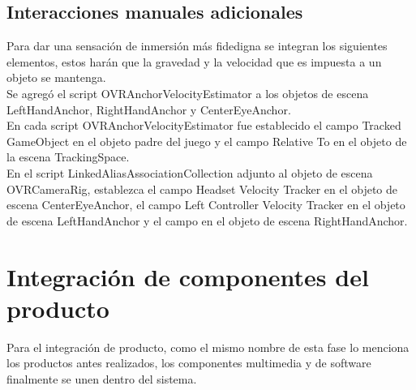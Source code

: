 \subsection{Interacciones manuales adicionales}

Para dar una sensación de inmersión más fidedigna se integran los siguientes elementos, estos harán que la gravedad y la velocidad que es impuesta a un objeto se mantenga.\\
Se agregó el script OVRAnchorVelocityEstimator a los objetos de escena LeftHandAnchor, RightHandAnchor y CenterEyeAnchor.\\
En cada script OVRAnchorVelocityEstimator fue establecido el campo Tracked GameObject en el objeto padre del juego y el campo Relative To en el objeto de la escena TrackingSpace.\\
En el script LinkedAliasAssociationCollection adjunto al objeto de escena OVRCameraRig, establezca el campo Headset Velocity Tracker en el objeto de escena CenterEyeAnchor, 
el campo Left Controller Velocity Tracker en el objeto de escena LeftHandAnchor y el campo en el objeto de escena RightHandAnchor.\\

\section{Integración de componentes del producto}
Para el integración de producto, como el mismo nombre de esta fase lo menciona los productos antes realizados, los componentes multimedia y de software finalmente se unen 
dentro del sistema.\\

